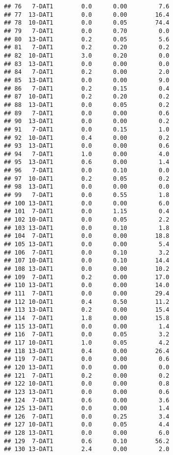 \documentclass[
]{article}
\begin{document}
\begin{verbatim}
## 76   7-DAT1        0.0      0.00         7.6
## 77  13-DAT1        0.0      0.00        16.4
## 78  10-DAT1        0.0      0.05        74.4
## 79   7-DAT1        0.0      0.70         0.0
## 80  13-DAT1        0.2      0.05         5.6
## 81   7-DAT1        0.2      0.20         0.2
## 82  10-DAT1        3.0      0.20         0.0
## 83  13-DAT1        0.0      0.00         0.0
## 84   7-DAT1        0.2      0.00         2.0
## 85  13-DAT1        0.0      0.00         9.0
## 86   7-DAT1        0.2      0.15         0.4
## 87  10-DAT1        0.2      0.20         0.2
## 88  13-DAT1        0.0      0.05         0.2
## 89   7-DAT1        0.0      0.00         0.6
## 90  13-DAT1        0.0      0.00         0.2
## 91   7-DAT1        0.0      0.15         1.0
## 92  10-DAT1        0.4      0.00         0.2
## 93  13-DAT1        0.0      0.00         0.6
## 94   7-DAT1        1.0      0.00         4.0
## 95  13-DAT1        0.6      0.00         1.4
## 96   7-DAT1        0.0      0.10         0.0
## 97  10-DAT1        0.2      0.05         0.2
## 98  13-DAT1        0.0      0.00         0.0
## 99   7-DAT1        0.0      0.55         1.8
## 100 13-DAT1        0.0      0.00         6.0
## 101  7-DAT1        0.0      1.15         0.4
## 102 10-DAT1        0.0      0.05         2.2
## 103 13-DAT1        0.0      0.10         1.8
## 104  7-DAT1        0.0      0.00        18.8
## 105 13-DAT1        0.0      0.00         5.4
## 106  7-DAT1        0.0      0.10         3.2
## 107 10-DAT1        0.0      0.10        14.4
## 108 13-DAT1        0.0      0.00        10.2
## 109  7-DAT1        0.2      0.00        17.0
## 110 13-DAT1        0.0      0.00        14.0
## 111  7-DAT1        0.0      0.00        29.4
## 112 10-DAT1        0.4      0.50        11.2
## 113 13-DAT1        0.2      0.00        15.4
## 114  7-DAT1        1.8      0.00        15.8
## 115 13-DAT1        0.0      0.00         1.4
## 116  7-DAT1        0.0      0.05         3.2
## 117 10-DAT1        1.0      0.05         4.2
## 118 13-DAT1        0.4      0.00        26.4
## 119  7-DAT1        0.0      0.00         0.6
## 120 13-DAT1        0.0      0.00         0.0
## 121  7-DAT1        0.2      0.00         0.2
## 122 10-DAT1        0.0      0.00         0.8
## 123 13-DAT1        0.0      0.00         0.6
## 124  7-DAT1        0.6      0.00         3.6
## 125 13-DAT1        0.0      0.00         1.4
## 126  7-DAT1        0.0      0.25         3.4
## 127 10-DAT1        0.0      0.05         4.4
## 128 13-DAT1        0.0      0.00         6.0
## 129  7-DAT1        0.6      0.10        56.2
## 130 13-DAT1        2.4      0.00         2.0

\end{verbatim}
\end{document}
